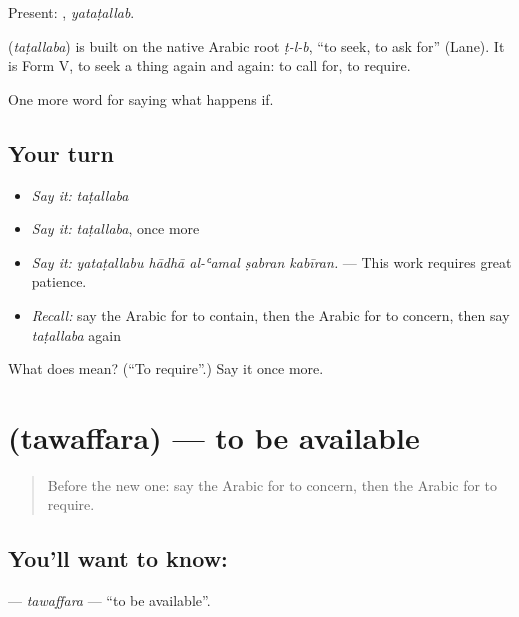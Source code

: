 Present: , \emph{yataṭallab}.

\begin{cousinweb}
\textbf{} (\emph{taṭallaba}) is built on the native Arabic root \emph{ṭ-l-b}, \textquotedblleft{}to seek, to ask for\textquotedblright{} (Lane). It is Form V, to seek a thing again and again: to call for, to require.
\end{cousinweb}

\begin{grammarlens}[title={What you've built}]
One more word for saying what happens if.
\end{grammarlens}

\subsection*{Your turn}
\begin{itemize}
\raggedright
  \item \emph{Say it:} \emph{taṭallaba}
  \item \emph{Say it:} \emph{taṭallaba}, once more
  \item \emph{Say it:} \emph{yataṭallabu hādhā al-ʿamal ṣabran kabīran.} — This work requires great patience.
  \item \emph{Recall:} say the Arabic for to contain, then the Arabic for to concern, then say \emph{taṭallaba} again
\end{itemize}

\begin{tcolorbox}[breakable,colback=teal!4,colframe=teal!35!black,title={Before you move on}]
What does  mean? (\textquotedblleft{}To require\textquotedblright{}.) Say it once more.
\end{tcolorbox}
\section[\texorpdfstring{\ar{توفر} (tawaffara)}{توفر (tawaffara)}]{ (tawaffara) — to be available}

\label{lesson:AR-C406-tawaffara}



\begin{quote}
Before the new one: say the Arabic for to concern, then the Arabic for to require.
\end{quote}

\subsection*{You'll want to know: }
\textbf{} — \emph{tawaffara} — \textquotedblleft{}to be available\textquotedblright{}.

